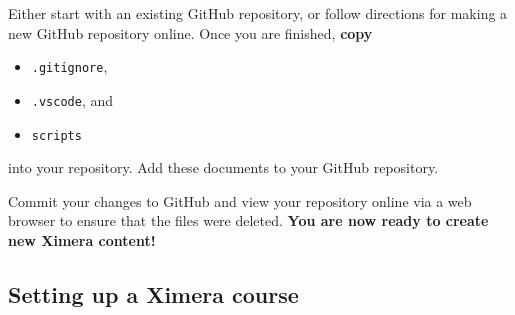 \documentclass{ximera}
\begin{document}
Either start with an existing GitHub repository, or follow directions for making a new GitHub repository online.
Once you are finished, \textbf{copy} 
\begin{itemize}
  \item \verb|.gitignore|, 
  \item \verb|.vscode|, and
  \item \verb|scripts| 
\end{itemize}
into your repository.
Add these documents to your GitHub repository.

Commit your changes to GitHub and view your
repository online via a web browser to ensure that the files were deleted. \textbf{You are now ready to create new Ximera content!}







\subsection{Setting up a Ximera course}
\end{document}
